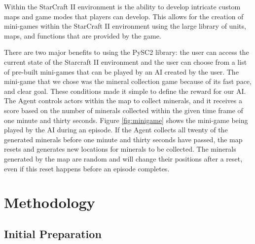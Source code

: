 \documentclass[12pt]{article}
\begin{document}
Within the StarCraft II environment is the ability to develop intricate custom maps and game modes that players can develop. This allows for the creation of mini-games within the StarCraft II environment using the large library of units, maps, and functions that are provided by the game. 

There are two major benefits to using the PySC2 library: the user can access the current state of the Starcraft II environment and the user can choose from a list of pre-built mini-games that can be played by an AI created by the user. The mini-game that we chose was the mineral collection game because of its fast pace, and clear goal. These conditions made it simple to define the reward for our AI. The Agent controls actors within the map to collect minerals, and it receives a score based on the number of minerals collected within the given time frame of one minute and thirty seconds. Figure \ref{fig:minigame} shows the mini-game being played by the AI during an episode. If the Agent collects all twenty of the generated minerals before one minute and thirty seconds have passed, the map resets and generates new locations for minerals to be collected. The minerals generated by the map are random and will change their positions after a reset, even if this reset happens before an episode completes.

%
%

\section*{\Large Methodology}

%
%
\subsection*{Initial Preparation}
\end{document}
